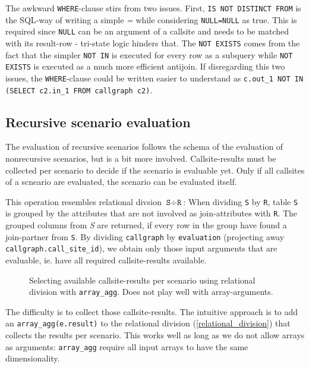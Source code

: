 The awkward \texttt{WHERE}-clause stirs from two issues. First, \texttt{IS NOT DISTINCT FROM} is the SQL-way of writing a simple \textit{=} while considering \texttt{NULL=NULL} as true. This is required since \texttt{NULL} can be an argument of a callsite and needs to be matched with its result-row - tri-state logic hinders that. The \texttt{NOT EXISTS} comes from the fact that the simpler \texttt{NOT IN} is executed for every row as a subquery while \texttt{NOT EXISTS} is executed as a much more efficient antijoin. If disregarding this two issues, the \texttt{WHERE}-clause could be written easier to understand as \texttt{c.out_1 NOT IN (SELECT c2.in_1 FROM callgraph c2)}.


\subsection{Recursive scenario evaluation}
The evaluation of recursive scenarios follows the schema of the evaluation of nonrecursive scenarios, but is a bit more involved. Callsite-results must be collected per scenario to decide if the scenario is evaluable yet. Only if all callsites of a scneario are evaluated, the scenario can be evaluated itself.

This operation resembles relational divsion $\texttt{S} \div \texttt{R}$: When dividing \texttt{S} by \texttt{R}, table \texttt{S} is grouped by the attributes that are not involved as join-attributes with \texttt{R}. The grouped columns from \textit{S} are returned, if every row in the group have found a join-partner from \texttt{S}. By dividing \texttt{callgraph} by \texttt{evaluation} (projecting away \texttt{callgraph.call\_site\_id}), we obtain only those input arguments that are evaluable, ie. have all required callsite-results available.

\begin{wrapfigure}{r}{0.6\textwidth}
  \caption{Selecting available callsite-results per scenario using relational division with \texttt{array\_agg}. Does not play well with array-arguments.}
  \label{relational_division}
\end{wrapfigure}

The difficulty is to collect those callsite-results. The intuitive approach is to add an \texttt{array\_agg(e.result)} to the relational division (\autoref{relational_division}) that collects the results per scenario. This works well as long as we do not allow arrays as arguments: \texttt{array\_agg} require all input arrays to have the same dimensionality.

